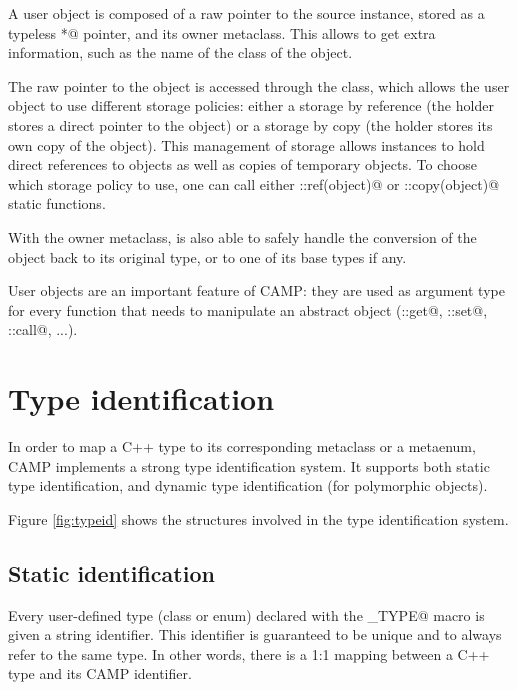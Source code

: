 \documentclass[a4paper, twoside]{report}
\begin{document}
	A user object is composed of a raw pointer to the source instance, stored as a typeless \verb@void*@ pointer,
	and its owner metaclass. This allows to get extra information, such as the name of the class of the object.
	
	The raw pointer to the object is accessed through the \verb@AbstractObjectHolder@ class, which allows
	the user object to use different storage policies: either a storage by reference (the holder stores a direct pointer to the object)
	or a storage by copy (the holder stores its own copy of the object). This management of storage allows \verb@UserObject@ instances
	to hold direct references to objects as well as copies of temporary objects.
	To choose which storage policy to use, one can call either \verb@UserObject::ref(object)@ or \verb@UserObject::copy(object)@ static functions.

	With the owner metaclass, \verb@UserObject@ is also able to safely handle the conversion of the object back to its original type,
	or to one of its base types if any.
	
	User objects are an important feature of CAMP: they are used as argument type for every function that needs to manipulate
	an abstract object (\verb@Property::get@, \verb@Property::set@, \verb@Function::call@, ...).


\chapter{Type identification}
\label{sec:identification}

	In order to map a C++ type to its corresponding metaclass or a metaenum, CAMP implements a strong
	type identification system. It supports both static type identification, and	dynamic type identification
	(for polymorphic objects).

	Figure \ref{fig:typeid} shows the structures involved in the type identification system.


\section{Static identification}
	
	Every user-defined type (class or enum) declared with the \verb@CAMP_TYPE@
	macro is given a string identifier. This identifier is guaranteed to
	be unique and to always refer to the same type. In other words, there is a 1:1
	mapping between a C++ type and its CAMP identifier.
	
\end{document}
